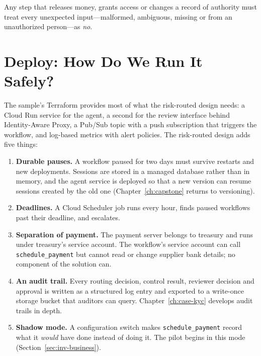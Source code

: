 \begin{principle}
Any step that releases money, grants access or changes a record of authority must treat every unexpected input---malformed, ambiguous, missing or from an unauthorized person---as \emph{no}.
\end{principle}

\section{Deploy: How Do We Run It Safely?}
\label{sec:inv-deploy}

The sample's Terraform provides most of what the risk-routed design needs: a Cloud Run service for the agent, a second for the review interface behind Identity-Aware Proxy, a Pub/Sub topic with a push subscription that triggers the workflow, and log-based metrics with alert policies. The risk-routed design adds five things:
\begin{enumerate}[itemsep=2pt]
  \item \textbf{Durable pauses.} A workflow paused for two days must survive restarts and new deployments. Sessions are stored in a managed database rather than in memory, and the agent service is deployed so that a new version can resume sessions created by the old one (Chapter~\ref{ch:capstone} returns to versioning).
  \item \textbf{Deadlines.} A Cloud Scheduler job runs every hour, finds paused workflows past their deadline, and escalates.
  \item \textbf{Separation of payment.} The payment server belongs to treasury and runs under treasury's service account. The workflow's service account can call \texttt{schedule\_payment} but cannot read or change supplier bank details; no component of the solution can.
  \item \textbf{An audit trail.} Every routing decision, control result, reviewer decision and approval is written as a structured log entry and exported to a write-once storage bucket that auditors can query. Chapter~\ref{ch:case-kyc} develops audit trails in depth.
  \item \textbf{Shadow mode.} A configuration switch makes \texttt{schedule\_payment} record what it \emph{would} have done instead of doing it. The pilot begins in this mode (Section~\ref{sec:inv-business}).
\end{enumerate}

